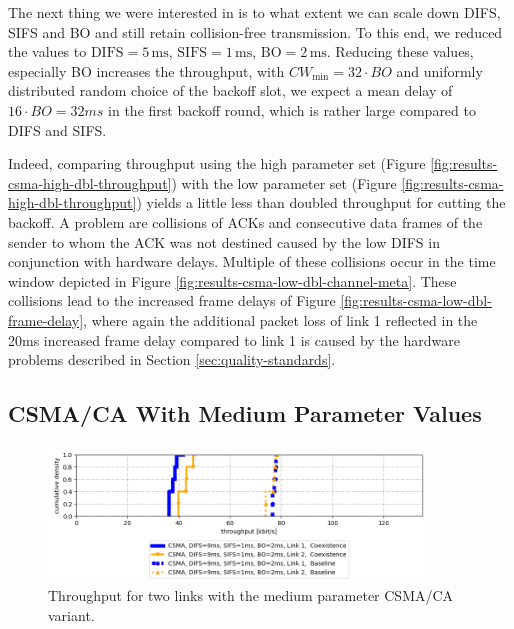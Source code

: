 The next thing we were interested in is to what extent we can scale down DIFS, SIFS and BO and still retain collision-free transmission. To this end, we reduced the values to $\text{DIFS}=5 \,\text{ms}$, $\text{SIFS}=1 \,\text{ms}$, $\text{BO}=2 \,\text{ms}$. Reducing these values, especially BO increases the throughput, with $CW_\text{min} = 32 \cdot BO$ and uniformly distributed random choice of the backoff slot, we expect a mean delay of $16\cdot BO=32ms$ in the first backoff round, which is rather large compared to DIFS and SIFS.

 Indeed, comparing throughput using the high parameter set (Figure \ref{fig:results-csma-high-dbl-throughput}) with the low parameter set (Figure \ref{fig:results-csma-high-dbl-throughput}) yields a little less than doubled throughput for cutting the backoff. 
 A problem are collisions of ACKs and consecutive data frames of the sender to whom the ACK was not destined caused by the low DIFS in conjunction with hardware delays. Multiple of these collisions occur in the time window depicted in Figure \ref{fig:results-csma-low-dbl-channel-meta}. These collisions lead to the increased frame delays of Figure \ref{fig:results-csma-low-dbl-frame-delay}, where again the additional packet loss of link 1 reflected in the 20ms increased frame delay compared to link 1 is caused by the hardware problems described in Section \ref{sec:quality-standards}.

\clearpage

\subsection{CSMA/CA With Medium Parameter Values}

\begin{figure}[tb]
	\label{fig:results-csma-med-dbl-throughput}
	\begin{center}
		\includegraphics[width=0.9\textwidth]{pictures/results/same_combinations/csma_med_params/throughput_cdf}
	\end{center}
	\caption{Throughput for two links with the medium parameter CSMA/CA variant.}
\end{figure}

